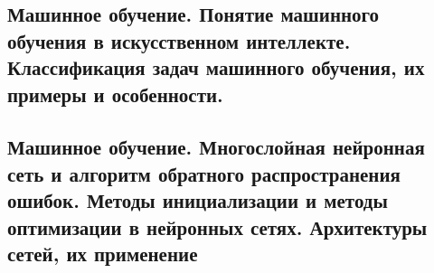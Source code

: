 \documentclass{article}
\begin{document}
\subsection{Машинное обучение. Понятие машинного обучения в искусственном интеллекте. Классификация задач машинного обучения, их примеры и особенности.}

\subsection{Машинное обучение. Многослойная нейронная сеть и алгоритм обратного распространения ошибок. Методы инициализации и методы оптимизации в нейронных сетях. Архитектуры сетей, их применение}
\end{document}
